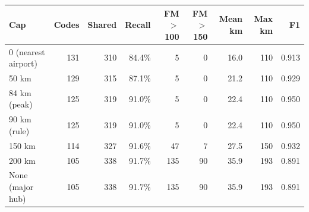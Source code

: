 \begin{tabular}{lrrrrrrrr}
\toprule
Cap & Codes & Shared & Recall & FM$>$100 & FM$>$150 & Mean km & Max km & F1 \\
\midrule
0 (nearest airport) & 131 & 310 & 84.4\% & 5 & 0 & 16.0 & 110 & 0.913 \\
50 km & 129 & 315 & 87.1\% & 5 & 0 & 21.2 & 110 & 0.929 \\
84 km (peak) & 125 & 319 & 91.0\% & 5 & 0 & 22.4 & 110 & 0.950 \\
90 km (rule) & 125 & 319 & 91.0\% & 5 & 0 & 22.4 & 110 & 0.950 \\
150 km & 114 & 327 & 91.6\% & 47 & 7 & 27.5 & 150 & 0.932 \\
200 km & 105 & 338 & 91.7\% & 135 & 90 & 35.9 & 193 & 0.891 \\
None (major hub) & 105 & 338 & 91.7\% & 135 & 90 & 35.9 & 193 & 0.891 \\
\bottomrule
\end{tabular}
